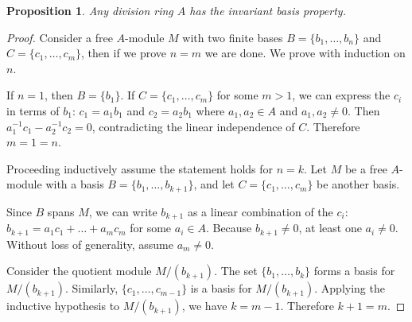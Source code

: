 \documentclass[12pt]{article}
\numberwithin{equation}{section}
\newcounter{dummy} \numberwithin{dummy}{section}
\newtheorem{proposition}[dummy]{Proposition}
\begin{document}
	\begin{proposition}\label{skewfieldsibp}
		Any division ring $A$ has the invariant basis property.
	\end{proposition}
	\begin{proof}
		Consider a free $A$-module $M$ with two finite bases $B = \{b_1, \dots, b_n\}$ and $C = \{c_1, \dots, c_m\}$, then if we prove $n=m$ we are done. We prove with induction on $n$.
		
		If $n=1$, then $B = \{b_1\}$. If $C = \{c_1, \dots, c_m\}$ for some $m>1$, we can express the $c_i$ in terms of $b_1$: $c_1 = a_1 b_1$ and $c_2 = a_2 b_1$ where $a_1, a_2 \in A$ and $a_1, a_2 \neq 0$. Then $a_1^{-1}c_1 - a_2^{-1}c_2 = 0$, contradicting the linear independence of $C$. Therefore $m=1=n$.
		
		Proceeding inductively assume the statement holds for $n=k$. 
		Let $M$ be a free $A$-module with a basis $B = \{b_1, \dots, b_{k+1}\}$, and let $C = \{c_1, \dots, c_m\}$ be another basis. 
		
		Since $B$ spans $M$, we can write $b_{k+1}$ as a linear combination of the $c_i$: $b_{k+1} = a_1 c_1 + \dots + a_m c_m$ for some $a_i \in A$. Because $b_{k+1} \neq 0$, at least one $a_i \neq 0$. Without loss of generality, assume $a_m \neq 0$.
		
		Consider the quotient module $M/(b_{k+1})$. The set $\{b_1, \dots, b_k\}$ forms a basis for $M/(b_{k+1})$. Similarly, $\{c_1, \dots, c_{m-1}\}$ is a basis for $M/(b_{k+1})$.  Applying the inductive hypothesis to $M/(b_{k+1})$, we have $k = m-1$.  Therefore $k+1 = m$.
	\end{proof}
	
\end{document}
